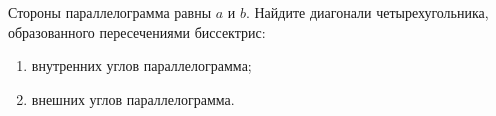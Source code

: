 \begin{ex}
	\begin{condition}
		Стороны параллелограмма равны \( a  \) и \( b \). Найдите диагонали четырехугольника, образованного пересечениями биссектрис: 
		\begin{enumerate}
			\item внутренних углов параллелограмма;
			\item внешних углов параллелограмма.
		\end{enumerate} 
	\end{condition}
\end{ex}
